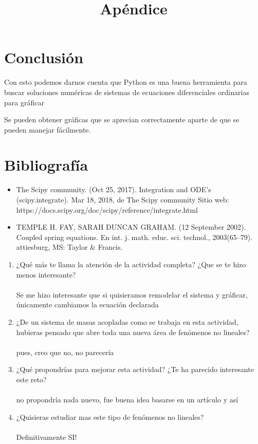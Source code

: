 \documentclass{article}
\begin{document}
\newpage

\section{Conclusión}

Con esto podemos darnos cuenta que Python es una buena herramienta para buscar soluciones numéricas de sistemas de ecuaciones diferenciales ordinarias para gráficar

Se pueden obtener gráficas que se aprecian correctamente aparte de que se pueden manejar fácilmente.
\newpage

\section{Bibliografía}
\begin{itemize}
\item The Scipy community. (Oct 25, 2017). Integration and ODE's (scipy.integrate). Mar 18, 2018, de The Scipy community Sitio web: ~\\ https://docs.scipy.org/doc/scipy/reference/integrate.html

\item TEMPLE H. FAY, SARAH DUNCAN GRAHAM. (12 September 2002). Coupled spring equations. En int. j. math. educ. sci. technol., 2003(65–79). attiesburg, MS: Taylor \& Francis. 
\end{itemize}

\newpage

\title{\textbf{Apéndice}}

\begin{enumerate}
\item ¿Qué más te llama la atención de la actividad completa? ¿Que se te hizo menos interesante? ~\\~\\
Se me hizo interesante que si quisieramos remodelar el sistema y gráficar, únicamente cambiamos la ecuación declarada


\item ¿De un sistema de masas acopladas como se trabaja en esta actividad, hubieras pensado que abre toda una nueva área de fenómenos no lineales? ~\\~\\
pues, creo que no, no parecería

\item ¿Qué propondrías para mejorar esta actividad? ¿Te ha parecido interesante este reto? ~\\~\\
no propondría nada nuevo, fue buena idea basarse en un artículo  y así

\item ¿Quisieras estudiar mas este tipo de fenómenos no lineales? ~\\~\\
Definitivamente SI!

\end{enumerate}
\end{document}
